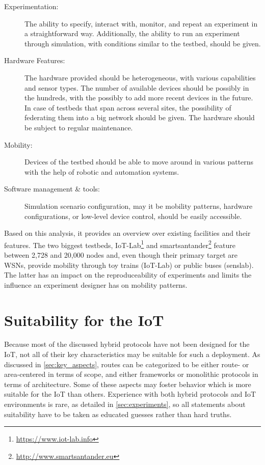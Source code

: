 \documentclass[a4paper,10pt]{scrartcl}
\begin{document}
\begin{description}
\item[Experimentation:] The ability to specify, interact with, monitor, and repeat an experiment in a straightforward way. Additionally, the ability to run an experiment through simulation, with conditions similar to the testbed, should be given.
\item[Hardware Features:] The hardware provided should be heterogeneous, with various capabilities and sensor types. The number of available devices should be possibly in the hundreds, with the possibly to add more recent devices in the future. In case of testbeds that span across several sites, the possibility of federating them into a big network should be given. The hardware should be subject to regular maintenance.
\item[Mobility:] Devices of the testbed should be able to move around in various patterns with the help of robotic and automation systems.
\item[Software management \& tools:] Simulation scenario configuration, may it be mobility patterns, hardware configurations, or low-level device control, should be easily accessible.
\end{description}
Based on this analysis, it provides an overview over existing facilities and their features. The two biggest testbeds, IoT-Lab\footnote{\url{https://www.iot-lab.info}} and smartsantander\footnote{\url{http://www.smartsantander.eu}} feature between 2,728 and 20,000 nodes and, even though their primary target are \glspl{WSN}, provide mobility through toy trains (IoT-Lab) or public buses (senslab). The latter has an impact on the reproduceability of experiments and limits the influence an experiment designer has on mobility patterns.

\section{Suitability for the IoT}
\label{sec:suitability}


Because most of the discussed hybrid protocols have not been designed for the IoT, not all of their key characteristics may be suitable for such a deployment. As discussed in \ref{sec:key_aspects}, routes can be categorized to be either route- or area-centered in terms of scope, and either frameworks or monolithic protocols in terms of architecture.
Some of these aspects may foster behavior which is more suitable for the IoT than others.
Experience with both hybrid protocols and IoT environments is rare, as detailed in \ref{sec:experiments}, so all statements about suitability have to be taken as educated guesses rather than hard truths.
\end{document}
